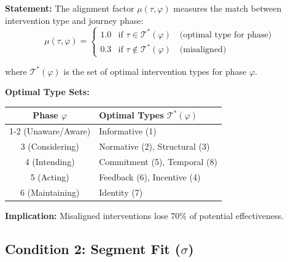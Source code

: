 \begin{tcolorbox}[colback=gray!5!white, colframe=gray!75!black,
    title=EIH Condition 1: Journey Alignment (from HHH Axiom HHH-A3)]

\textbf{Statement:} The alignment factor $\mu(\tau, \varphi)$ measures the match
between intervention type and journey phase:
\begin{equation}
\mu(\tau, \varphi) = \begin{cases}
1.0 & \text{if } \tau \in \mathcal{T}^*(\varphi) \quad \text{(optimal type for phase)} \\
0.3 & \text{if } \tau \notin \mathcal{T}^*(\varphi) \quad \text{(misaligned)}
\end{cases}
\label{eq:mu-alignment}
\end{equation}

where $\mathcal{T}^*(\varphi)$ is the set of optimal intervention types for phase $\varphi$.

\textbf{Optimal Type Sets:}
\begin{center}
\renewcommand{\arraystretch}{1.2}
\begin{tabular}{@{}cl@{}}
\toprule
\textbf{Phase $\varphi$} & \textbf{Optimal Types $\mathcal{T}^*(\varphi)$} \\
\midrule
1-2 (Unaware/Aware) & Informative (1) \\
3 (Considering) & Normative (2), Structural (3) \\
4 (Intending) & Commitment (5), Temporal (8) \\
5 (Acting) & Feedback (6), Incentive (4) \\
6 (Maintaining) & Identity (7) \\
\bottomrule
\end{tabular}
\end{center}

\textbf{Implication:} Misaligned interventions lose 70\% of potential effectiveness.
\end{tcolorbox}

\subsection{Condition 2: Segment Fit ($\sigma$)}

